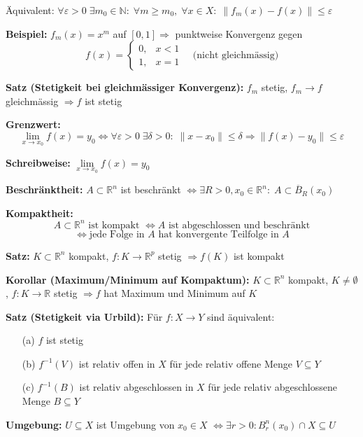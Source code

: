 \begin{itemize}
Äquivalent:  
\(\forall \varepsilon > 0\; \exists m_0 \in \mathbb{N}:\; \forall m \ge m_0,\; \forall x \in X:\; \|f_m(x) - f(x)\| \le \varepsilon\)

\textbf{Beispiel:} \(f_m(x) = x^m\) auf \([0,1] \Rightarrow\) punktweise Konvergenz gegen  
\[
f(x) = \begin{cases}
0, & x < 1 \\
1, & x = 1
\end{cases}
\quad \text{(nicht gleichmässig)}
\]

\textbf{Satz (Stetigkeit bei gleichmässiger Konvergenz):}  
\(f_m\) stetig,\; \(f_m \to f\) gleichmässig \(\Rightarrow f\) ist stetig


\textbf{Grenzwert:}  
\[
\lim_{x \to x_0} f(x) = y_0 \Leftrightarrow
\forall \varepsilon > 0\; \exists \delta > 0:\;
\|x - x_0\| \leq \delta \Rightarrow \|f(x) - y_0\| \leq \varepsilon
\]

\textbf{Schreibweise:}  
\( \lim\limits_{x \to x_0} f(x) = y_0 \)

\textbf{Beschränktheit:}  
\(A \subset \mathbb{R}^n\) ist beschränkt \(\Leftrightarrow \exists R > 0, x_0 \in \mathbb{R}^n:\; A \subset \overline{B}_R(x_0)\)

\textbf{Kompaktheit:}  
\[
A \subset \mathbb{R}^n \text{ ist kompakt } \Leftrightarrow A \text{ ist abgeschlossen und beschränkt}
\]
\[
\Leftrightarrow \text{jede Folge in } A \text{ hat konvergente Teilfolge in } A
\]

\textbf{Satz:}  
\(K \subset \mathbb{R}^n\) kompakt,\; \(f: K \to \mathbb{R}^p\) stetig  
\(\Rightarrow f(K)\) ist kompakt

\textbf{Korollar (Maximum/Minimum auf Kompaktum):}  
\(K \subset \mathbb{R}^n\) kompakt, \(K \ne \emptyset\), \(f: K \to \mathbb{R}\) stetig  
\(\Rightarrow f\) hat Maximum und Minimum auf \(K\)

\textbf{Satz (Stetigkeit via Urbild):}  
Für \(f: X \to Y\) sind äquivalent:
\begin{itemize}
  \item[(a)] \(f\) ist stetig
  \item[(b)] \(f^{-1}(V)\) ist relativ offen in \(X\) für jede relativ offene Menge \(V \subseteq Y\)
  \item[(c)] \(f^{-1}(B)\) ist relativ abgeschlossen in \(X\) für jede relativ abgeschlossene Menge \(B \subseteq Y\)
\end{itemize}

\textbf{Umgebung:}  
\(U \subseteq X\) ist Umgebung von \(x_0 \in X\)  
\(\Leftrightarrow \exists r > 0: B_r^n(x_0) \cap X \subseteq U\)


\end{itemize}
